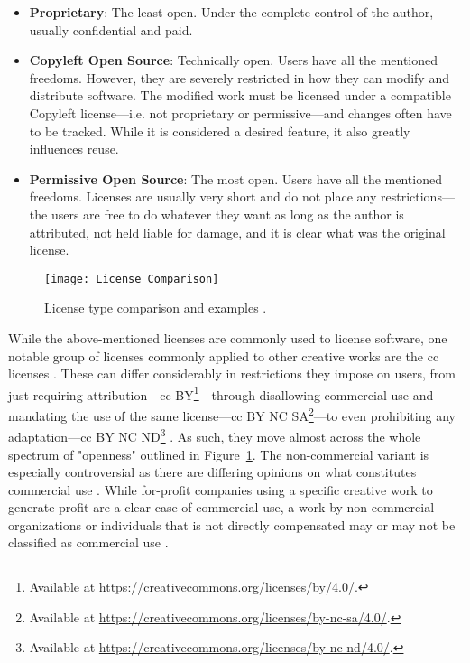 \begin{itemize}
    \item \textbf{Proprietary}: The least open. Under the complete control of the author, usually confidential and paid.
    \item \textbf{Copyleft Open Source}: Technically open. Users have all the mentioned freedoms. However, they are severely restricted in how they can modify and distribute software. The modified work must be licensed under a compatible Copyleft license---i.e. not proprietary or permissive---and changes often have to be tracked. While it is considered a desired feature, it also greatly influences reuse.
    \item \textbf{Permissive Open Source}: The most open. Users have all the mentioned freedoms. Licenses are usually very short and do not place any restrictions---the users are free to do whatever they want as long as the author is attributed, not held liable for damage, and it is clear what was the original license.
\end{itemize}

\begin{figure}[H]
    \centering
    \texttt{[image: License\_Comparison]}
    \caption{License type comparison and examples \parencite{Duras_2020}.}
    \label{fig:license-comparison}
\end{figure}

While the above-mentioned licenses are commonly used to license software, one notable group of licenses commonly applied to other creative works are the \gls{cc} licenses \parencite{Hagedorn_2011}.
These can differ considerably in restrictions they impose on users, from just requiring attribution---\gls{cc} BY\footnote{Available at \url{https://creativecommons.org/licenses/by/4.0/}.}---through disallowing commercial use and mandating the use of the same license---\gls{cc} BY NC SA\footnote{Available at \url{https://creativecommons.org/licenses/by-nc-sa/4.0/}.}---to even prohibiting any adaptation---\gls{cc} BY NC ND\footnote{Available at \url{https://creativecommons.org/licenses/by-nc-nd/4.0/}.} \parencite{Hagedorn_2011}.
As such, they move almost across the whole spectrum of "openness" outlined in Figure~\ref{fig:license-comparison}.
The non-commercial variant is especially controversial as there are differing opinions on what constitutes commercial use \parencite{Hagedorn_2011}.
While for-profit companies using a specific creative work to generate profit are a clear case of commercial use, a work by non-commercial organizations or individuals that is not directly compensated may or may not be classified as commercial use \parencite{Hagedorn_2011}.

